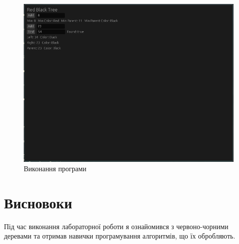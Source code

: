 \documentclass{article}
\begin{document}
\begin{normalsize}
\begin{lstlisting}[language=C]
		\end{lstlisting}
		
		\begin{figure}[H]
			\centering
			\includegraphics[scale=0.6]{1}	
			\caption{Виконання програми}
		\end{figure}
		
		\section*{Висновоки}
		Під час виконання лабораторної роботи я ознайомився з червоно-чорними деревами та отримав навички програмування алгоритмів, що їх обробляють. 
		
	\end{normalsize}
\end{document}
